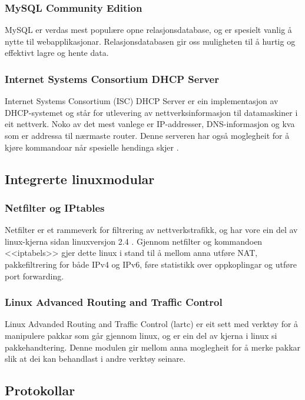 \documentclass[nynorsk,12pt,a4paper,oneside]{book}
\begin{document}
\subsubsection{MySQL Community Edition}
MySQL er verdas mest populære opne relasjonsdatabase, og er spesielt vanlig å nytte til webapplikasjonar. Relasjonsdatabasen gir oss muligheten til å hurtig og effektivt lagre og hente data. \cite{mysqlwww} 

\subsubsection{Internet Systems Consortium DHCP Server}
Internet Systems Consortium (ISC) DHCP Server er ein implementasjon av DHCP-systemet og står for utlevering av nettverksinformasjon til datamaskiner i eit nettverk. Noko av det mest vanlege er IP-addresser, DNS-informasjon og kva som er addressa til nærmaste router. Denne serveren har også moglegheit for å kjøre kommandoar når spesielle hendinga skjer \cite{dhcpconf, dhcpdman}. 

\subsection{Integrerte linuxmodular}
\subsubsection{Netfilter og IPtables}
Netfilter er et rammeverk for filtrering av nettverkstrafikk, og har vore ein del av linux-kjerna sidan linuxversjon 2.4 \cite{netfiltercore}. Gjennom netfilter og kommandoen <<iptabels>> gjer dette linux i stand til å mellom anna utføre NAT, pakkefiltrering for både IPv4 og IPv6, føre statistikk over oppkoplingar og utføre port forwarding. 

\subsubsection{Linux Advanced Routing and Traffic Control}
Linux Advanded Routing and Traffic Control (lartc) er eit sett med verktøy for å manipulere pakkar som går gjennom linux, og er ein del av kjerna i linux si pakkehandtering. \cite{lartcintro} Denne modulen gir mellom anna moglegheit for å merke pakkar slik at dei kan behandlast i andre verktøy seinare. 

\subsection{Protokollar}
\end{document}
